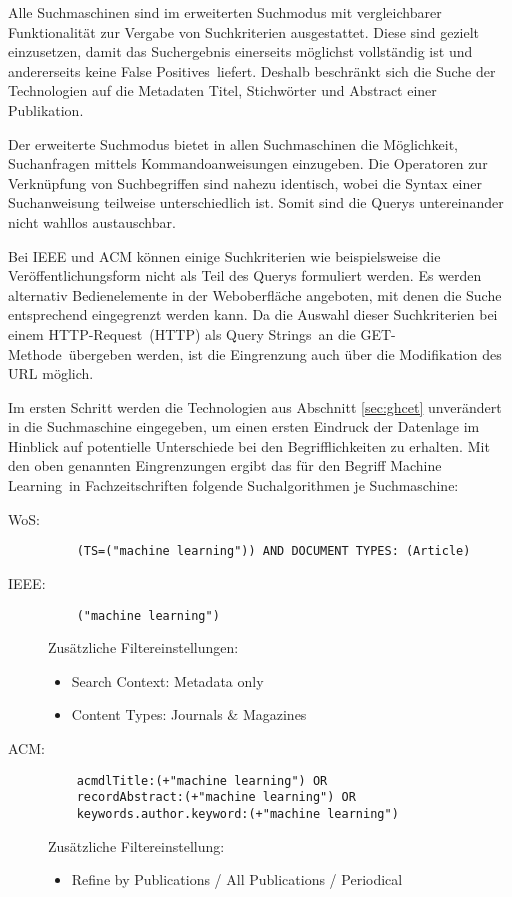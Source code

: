 Alle Suchmaschinen sind im erweiterten Suchmodus mit vergleichbarer Funktionalität zur Vergabe von Suchkriterien ausgestattet. Diese sind gezielt einzusetzen, damit das Suchergebnis einerseits möglichst vollständig ist und andererseits keine \glqq False Positives\grqq~liefert. Deshalb beschränkt sich die Suche der Technologien auf die Metadaten Titel, Stichwörter und Abstract einer Publikation.

Der erweiterte Suchmodus bietet in allen Suchmaschinen die Möglichkeit, Suchanfragen mittels Kommandoanweisungen einzugeben. Die Operatoren zur Verknüpfung von Suchbegriffen sind nahezu identisch, wobei die Syntax einer Suchanweisung teilweise unterschiedlich ist. Somit sind die Querys untereinander nicht wahllos austauschbar.

Bei \ac{IEEE} und \ac{ACM} können einige Suchkriterien wie beispielsweise die Veröffentlichungsform nicht als Teil des Querys formuliert werden. Es werden alternativ Bedienelemente in der Web\-oberfläche angeboten, mit denen die Suche entsprechend eingegrenzt werden kann. Da die Auswahl dieser Suchkriterien bei einem \glqq\acs{HTTP}-Request\grqq~(\acl{HTTP}) als \glqq Query Strings\grqq~an die \glqq GET-Methode\grqq~übergeben werden, ist die Eingrenzung auch über die Modifikation des \ac{URL} möglich.

Im ersten Schritt werden die Technologien aus Abschnitt \ref{sec:ghcet} unverändert in die Suchmaschine eingegeben, um einen ersten Eindruck der Datenlage im Hinblick auf potentielle Unterschiede bei den Begrifflichkeiten zu erhalten. Mit den oben genannten Eingrenzungen ergibt das für den Begriff \glqq Machine Learning\grqq~in Fachzeitschriften folgende Suchalgorithmen je Suchmaschine:

\begin{description}
	\item [\acs{WoS}:] \begin{verbatim}
	(TS=("machine learning")) AND DOCUMENT TYPES: (Article)
	\end{verbatim}

	\item [\acs{IEEE}:] \begin{verbatim}
	("machine learning")
	\end{verbatim}
	Zusätzliche Filtereinstellungen:
	\begin{itemize}
		\item Search Context: Metadata only
		\item Content Types: Journals \& Magazines
	\end{itemize}

	\item [\acs{ACM}:] \begin{verbatim}
	acmdlTitle:(+"machine learning") OR
	recordAbstract:(+"machine learning") OR
	keywords.author.keyword:(+"machine learning")
	\end{verbatim}
	Zusätzliche Filtereinstellung:
	\begin{itemize}
		\item Refine by Publications / All Publications / Periodical
	\end{itemize}
\end{description}


